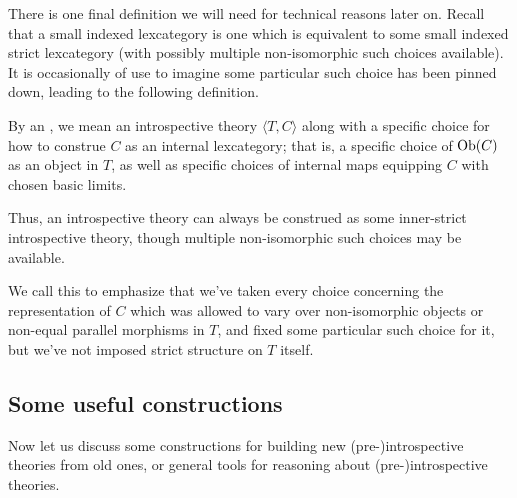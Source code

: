 There is one final definition we will need for technical reasons later on. Recall that a small indexed lexcategory is one which is equivalent to some small indexed strict lexcategory (with possibly multiple non-isomorphic such choices available). It is occasionally of use to imagine some particular such choice has been pinned down, leading to the following definition.

\begin{definition}
By an , we mean an introspective theory $\langle T, C\rangle$ along with a specific choice for how to construe $C$ as an internal lexcategory; that is, a specific choice of $\operatorname{Ob}(C)$ as an object in $T$, as well as specific choices of internal maps equipping $C$ with chosen basic limits.
\end{definition}

Thus, an introspective theory can always be construed as some inner-strict introspective theory, though multiple non-isomorphic such choices may be available. 

We call this  to emphasize that we've taken every choice concerning the representation of $C$ which was allowed to vary over non-isomorphic objects or non-equal parallel morphisms in $T$, and fixed some particular such choice for it, but we've not imposed strict structure on $T$ itself.

\subsection{Some useful constructions}
Now let us discuss some constructions for building new (pre-)introspective theories from old ones, or general tools for reasoning about (pre-)introspective theories.

